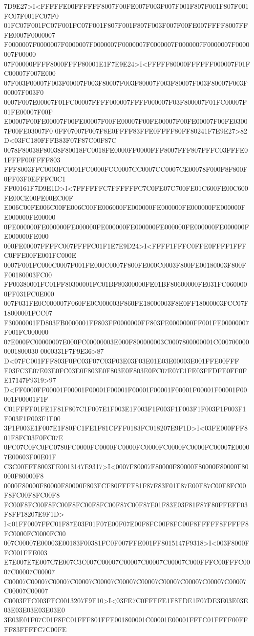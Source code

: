 7D9E27>I<FFFFFE00FFFFFF8007F00FE007F003F007F001F807F001F807F001FC07F001FC07F0
01FC07F001FC07F001FC07F001F807F001F807F003F007F00FE007FFFF8007FFFE0007F0000007
F0000007F0000007F0000007F0000007F0000007F0000007F0000007F0000007F0000007F00000
07F00000FFFF8000FFFF80001E1F7E9E24>I<FFFFF80000FFFFFF000007F01FC00007F007E000
07F003F00007F003F00007F003F80007F003F80007F003F80007F003F80007F003F00007F003F0
0007F007E00007F01FC00007FFFF000007FFFF000007F03F800007F01FC00007F01FE00007F00F
E00007F00FE00007F00FE00007F00FE00007F00FE00007F00FE00007F00FE03007F00FE03007F0
0FF07007F007F8E0FFFF83FFE0FFFF80FF80241F7E9E27>82 D<03FC180FFFB83F07F87C00F87C
0078F80038F80038F80018FC0018FE0000FF0000FFF8007FFF807FFFC03FFFE01FFFF00FFFF803
FFF8003FFC0003FC0001FC0000FCC0007CC0007CC0007CE00078F000F8F800F0FF03F0EFFFC0C1
FF00161F7D9E1D>I<7FFFFFFC7FFFFFFC7C0FE07C700FE01C600FE00C600FE00CE00FE00EC00F
E006C00FE006C00FE006C00FE006000FE000000FE000000FE000000FE000000FE000000FE00000
0FE000000FE000000FE000000FE000000FE000000FE000000FE000000FE000000FE000000FE000
000FE00007FFFFC007FFFFC01F1E7E9D24>I<FFFF1FFFC0FFE0FFFF1FFFC0FFE00FE001FC000E
0007F001FC000C0007F001FE000C0007F800FE000C0003F800FE00180003F800FF00180003FC00
FF00380001FC01FF80300001FC01BF80300000FE01BF80600000FE031FC0600000FF031FC0E000
007F031FE0C000007F060FE0C000003F860FE18000003F8E0FF18000003FCC07F18000001FCC07
F30000001FD803FB0000001FF803FF0000000FF803FE0000000FF001FE00000007F001FC000000
07E000FC00000007E000FC00000003E000F800000003C0007800000001C0007000000001800030
0000331F7F9E36>87 D<07FC001FFF803F0FC03F07C03F03E03F03E01E03E00003E001FFE00FFF
E03FC3E07E03E0FC03E0F803E0F803E0F803E0FC07E07E1FE03FFDFE0FF0FE17147F9319>97
D<FF0000FF00001F00001F00001F00001F00001F00001F00001F00001F00001F00001F00001F1F
C01FFFF01FE1F81F807C1F007E1F003E1F003F1F003F1F003F1F003F1F003F1F003F1F003F1F00
3F1F003E1F007E1F80FC1FE1F81CFFF0183FC018207E9F1D>I<03FE000FFF801F8FC03F0FC07E
0FC07C0FC0FC0780FC0000FC0000FC0000FC0000FC0000FC0000FC00007E00007E00603F00E01F
C3C00FFF8003FE0013147E9317>I<0007F80007F80000F80000F80000F80000F80000F80000F8
0000F80000F80000F80000F803FCF80FFFF81F87F83F01F87E00F87C00F8FC00F8FC00F8FC00F8
FC00F8FC00F8FC00F8FC00F8FC00F87C00F87E01F83E03F81F87F80FFEFF03F8FF18207E9F1D>
I<01FF0007FFC01F87E03F01F07E00F07E00F8FC00F8FC00F8FFFFF8FFFFF8FC0000FC0000FC00
007C00007E00003E00183F00381FC0F007FFE001FF8015147F9318>I<003F8000FFC001FFE003
E7E007E7E007C7E007C3C007C00007C00007C00007C00007C000FFFC00FFFC0007C00007C00007
C00007C00007C00007C00007C00007C00007C00007C00007C00007C00007C00007C00007C00007
C0003FFC003FFC0013207F9F10>I<03FE7C0FFFFE1F8FDE1F07DE3E03E03E03E03E03E03E03E0
3E03E01F07C01F8FC01FFF801FFE001800001C00001E00001FFFC01FFFF00FFFF83FFFFC7C00FE
